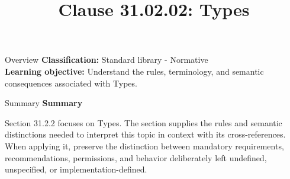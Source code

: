 \documentclass[10pt,letterpaper]{article}
\title{Clause 31.02.02: Types}
\author{}
\date{}
\begin{document}
\maketitle
\begin{CornellOverviewBox}{Overview}
\textbf{Classification:} Standard library - Normative\\[2pt]
\textbf{Learning objective:} Understand the rules, terminology, and semantic consequences associated with Types.
\end{CornellOverviewBox}\begin{CornellSummaryBox}{Summary}
{\sffamily\bfseries\color{Accent} Summary}\par\vspace{3pt}Section 31.2.2 focuses on Types. The section supplies the rules and semantic distinctions needed to interpret this topic in context with its cross-references. When applying it, preserve the distinction between mandatory requirements, recommendations, permissions, and behavior deliberately left undefined, unspecified, or implementation-defined.
\end{CornellSummaryBox}
\end{document}
